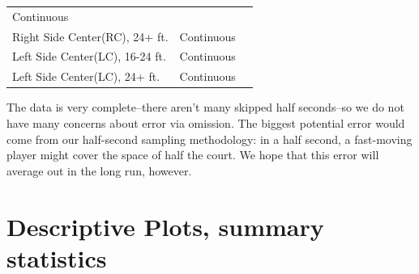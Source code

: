 \documentclass[]{article}
\begin{document}
\begin{longtable}[]{@{}lll@{}}
\begin{minipage}[t]{0.12\columnwidth}
Continuous\strut
\end{minipage} & \begin{minipage}[t]{0.47\columnwidth}\raggedright
\strut
\end{minipage}\tabularnewline
\begin{minipage}[t]{0.32\columnwidth}\raggedright
Right Side Center(RC), 24+ ft.\strut
\end{minipage} & \begin{minipage}[t]{0.12\columnwidth}\raggedright
Continuous\strut
\end{minipage} & \begin{minipage}[t]{0.47\columnwidth}\raggedright
\strut
\end{minipage}\tabularnewline
\begin{minipage}[t]{0.32\columnwidth}\raggedright
Left Side Center(LC), 16-24 ft.\strut
\end{minipage} & \begin{minipage}[t]{0.12\columnwidth}\raggedright
Continuous\strut
\end{minipage} & \begin{minipage}[t]{0.47\columnwidth}\raggedright
\strut
\end{minipage}\tabularnewline
\begin{minipage}[t]{0.32\columnwidth}\raggedright
Left Side Center(LC), 24+ ft.\strut
\end{minipage} & \begin{minipage}[t]{0.12\columnwidth}\raggedright
Continuous\strut
\end{minipage} & \begin{minipage}[t]{0.47\columnwidth}\raggedright
\strut
\end{minipage}\tabularnewline
\bottomrule
\end{longtable}

The data is very complete--there aren't many skipped half seconds--so we
do not have many concerns about error via omission. The biggest
potential error would come from our half-second sampling methodology: in
a half second, a fast-moving player might cover the space of half the
court. We hope that this error will average out in the long run,
however.

\hypertarget{descriptive-plots-summary-statistics}{%
\section{Descriptive Plots, summary
statistics}\label{descriptive-plots-summary-statistics}}
\end{document}
